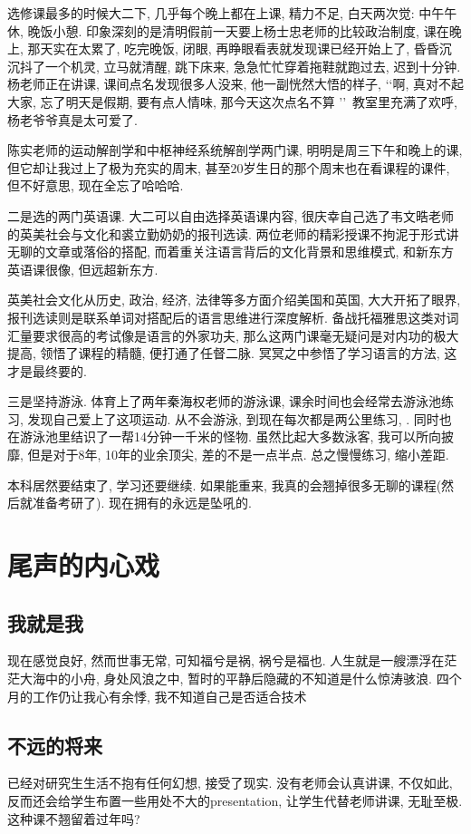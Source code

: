 \documentclass[a4paper, UTF8,  12pt]{article}
\begin{document}
选修课最多的时候大二下, 几乎每个晚上都在上课, 精力不足, 白天两次觉: 中午午休, 晚饭小憩. 印象深刻的是清明假前一天要上杨士忠老师的比较政治制度, 课在晚上, 那天实在太累了, 吃完晚饭, 闭眼, 再睁眼看表就发现课已经开始上了, 昏昏沉沉抖了一个机灵, 立马就清醒, 跳下床来, 急急忙忙穿着拖鞋就跑过去, 迟到十分钟. 杨老师正在讲课, 课间点名发现很多人没来, 他一副恍然大悟的样子, \lq\lq 啊, 真对不起大家, 忘了明天是假期, 要有点人情味, 那今天这次点名不算 \rq\rq\ 教室里充满了欢呼, 杨老爷爷真是太可爱了. 

陈实老师的运动解剖学和中枢神经系统解剖学两门课, 明明是周三下午和晚上的课, 但它却让我过上了极为充实的周末, 甚至20岁生日的那个周末也在看课程的课件, 但不好意思, 现在全忘了哈哈哈.

二是选的两门英语课. 大二可以自由选择英语课内容, 很庆幸自己选了韦文晧老师的英美社会与文化和裘立勤奶奶的报刊选读. 两位老师的精彩授课不拘泥于形式讲无聊的文章或落俗的搭配, 而着重关注语言背后的文化背景和思维模式, 和新东方英语课很像, 但远超新东方. 

英美社会文化从历史, 政治, 经济, 法律等多方面介绍美国和英国, 大大开拓了眼界, 报刊选读则是联系单词对搭配后的语言思维进行深度解析. 备战托福雅思这类对词汇量要求很高的考试像是语言的外家功夫, 那么这两门课毫无疑问是对内功的极大提高, 领悟了课程的精髓, 便打通了任督二脉. 冥冥之中参悟了学习语言的方法, 这才是最终要的.

三是坚持游泳. 体育上了两年秦海权老师的游泳课, 课余时间也会经常去游泳池练习, 发现自己爱上了这项运动. 从不会游泳, 到现在每次都是两公里练习, . 同时也在游泳池里结识了一帮14分钟一千米的怪物. 虽然比起大多数泳客, 我可以所向披靡, 但是对于8年, 10年的业余顶尖, 差的不是一点半点. 总之慢慢练习, 缩小差距.

本科居然要结束了, 学习还要继续. 如果能重来, 我真的会翘掉很多无聊的课程(然后就准备考研了). 现在拥有的永远是坠吼的.

\newpage
\section{尾声的内心戏}
\subsection{我就是我}

现在感觉良好, 然而世事无常, 可知福兮是祸, 祸兮是福也. 人生就是一艘漂浮在茫茫大海中的小舟, 身处风浪之中, 暂时的平静后隐藏的不知道是什么惊涛骇浪. 四个月的工作仍让我心有余悸, 我不知道自己是否适合技术
\subsection{不远的将来}

已经对研究生生活不抱有任何幻想, 接受了现实. 没有老师会认真讲课, 不仅如此, 反而还会给学生布置一些用处不大的presentation, 让学生代替老师讲课, 无耻至极. 这种课不翘留着过年吗?
\end{document}
